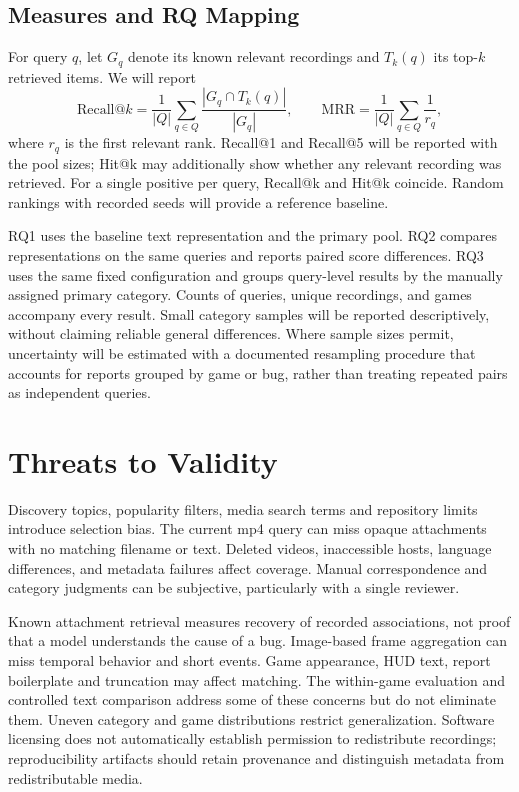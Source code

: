 \documentclass[journal,a4paper,onecolumn]{IEEEtran}
\begin{document}
\subsection{Measures and RQ Mapping}
For query $q$, let $G_q$ denote its known relevant recordings and $T_k(q)$ its top-$k$ retrieved items. We will report
\begin{equation}
\mathrm{Recall@}k=\frac{1}{|Q|}\sum_{q\in Q}\frac{|G_q\cap T_k(q)|}{|G_q|},\qquad
\mathrm{MRR}=\frac{1}{|Q|}\sum_{q\in Q}\frac{1}{r_q},
\end{equation}
where $r_q$ is the first relevant rank. Recall@1 and Recall@5 will be reported with the pool sizes; Hit@k may additionally show whether any relevant recording was retrieved. For a single positive per query, Recall@k and Hit@k coincide. Random rankings with recorded seeds will provide a reference baseline.

RQ1 uses the baseline text representation and the primary pool. RQ2 compares representations on the same queries and reports paired score differences. RQ3 uses the same fixed configuration and groups query-level results by the manually assigned primary category. Counts of queries, unique recordings, and games accompany every result. Small category samples will be reported descriptively, without claiming reliable general differences. Where sample sizes permit, uncertainty will be estimated with a documented resampling procedure that accounts for reports grouped by game or bug, rather than treating repeated pairs as independent queries.

\section{Threats to Validity}
Discovery topics, popularity filters, media search terms and repository limits introduce selection bias. The current mp4 query can miss opaque attachments with no matching filename or text. Deleted videos, inaccessible hosts, language differences, and metadata failures affect coverage. Manual correspondence and category judgments can be subjective, particularly with a single reviewer.

Known attachment retrieval measures recovery of recorded associations, not proof that a model understands the cause of a bug. Image-based frame aggregation can miss temporal behavior and short events. Game appearance, HUD text, report boilerplate and truncation may affect matching. The within-game evaluation and controlled text comparison address some of these concerns but do not eliminate them. Uneven category and game distributions restrict generalization. Software licensing does not automatically establish permission to redistribute recordings; reproducibility artifacts should retain provenance and distinguish metadata from redistributable media.
\end{document}
